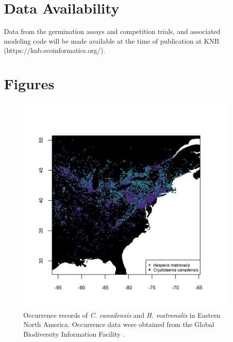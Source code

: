 \documentclass{article}[11pt]
\begin{document}

\section*{Data Availability}
Data from the germination assays and competition trials, and associated modeling code will be made available at the time of publication at KNB (https://knb.ecoinformatics.org/).


\section*{Figures}


\begin{figure}[h!] %
    \centering
\includegraphics[width=.95\textwidth]{..//figure/cchhmmap4.jpeg}
\caption{Occurrence records of \textit{C. canadensis} and \textit{H. matronalis} in Eastern North America. Occurrence data were obtained from the Global Biodiversity Information Facility \citep[GBIF,][]{gbif}.} 
   \label{fig:map}
\end{figure}
\end{document}
